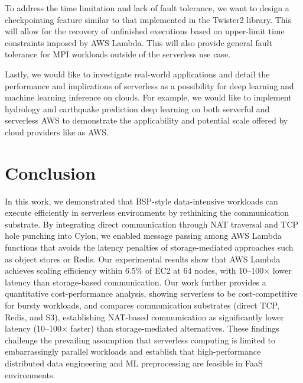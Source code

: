 \documentclass[conference]{IEEEtran}
\begin{document}
To address the time limitation and lack of fault tolerance, we want to design a checkpointing feature similar to that implemented in the Twister2 library.  This will allow for the recovery of unfinished executions based on upper-limit time constraints imposed by AWS Lambda.  This will also provide general fault tolerance for MPI workloads outside of the serverless use case.  

Lastly, we would like to investigate real-world applications and detail the performance and implications of serverless as a possibility for deep learning and machine learning inference on clouds.  For example, we would like to implement hydrology and earthquake prediction deep learning on both serverful and serverless AWS to demonstrate the applicability and potential scale offered by cloud providers like as AWS.







\section{Conclusion}
\label{sec:conclusion}
In this work, we demonstrated that BSP-style data-intensive workloads can execute efficiently in serverless environments by rethinking the communication substrate. By integrating direct communication through NAT traversal and TCP hole punching into Cylon, we enabled message passing among AWS Lambda functions that avoids the latency penalties of storage-mediated approaches such as object stores or Redis. Our experimental results show that AWS Lambda achieves scaling efficiency within 6.5\% of EC2 at 64 nodes, with 10–100× lower latency than storage-based communication. Our work further provides a quantitative cost-performance analysis, showing serverless to be cost-competitive for bursty workloads, and compares communication substrates (direct TCP, Redis, and S3), establishing NAT-based communication as significantly lower latency (10–100× faster) than storage-mediated alternatives. These findings challenge the prevailing assumption that serverless computing is limited to embarrassingly parallel workloads and establish that high-performance distributed data engineering and ML preprocessing are feasible in FaaS environments.
\end{document}
